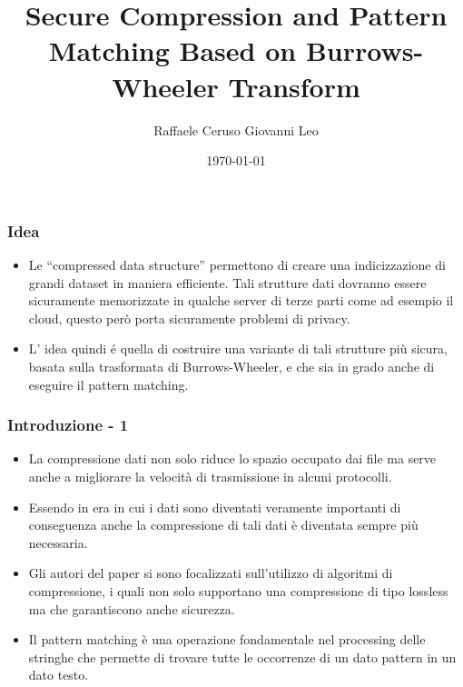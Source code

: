 \documentclass{beamer}
\title[]{Secure Compression and Pattern Matching Based on Burrows-Wheeler Transform}
\institute{Università degli Studi di Salerno}
\author{Raffaele Ceruso Giovanni Leo}
\date{\today}
\begin{document}
\begin{frame}
\titlepage
\end{frame}
\begin{frame}
\frametitle{Idea}
	\begin{itemize}
		\item Le ``compressed data structure'' permettono di creare una indicizzazione di grandi dataset in maniera efficiente. Tali strutture dati dovranno essere sicuramente memorizzate in qualche server di terze parti come ad esempio il cloud, questo però porta sicuramente problemi di privacy. \pause
		\item L’ idea quindi é quella di costruire una variante di tali strutture più sicura, basata sulla trasformata di Burrows-Wheeler, e che sia in grado anche di eseguire il pattern matching.
	\end{itemize}
\end{frame}
\begin{frame}
\frametitle{Introduzione - 1}
	\begin{itemize}
	 \item La compressione dati non solo riduce lo spazio occupato dai file ma serve anche a migliorare la velocità di trasmissione in alcuni protocolli.
	 \pause
	 \item Essendo in era in cui i dati sono diventati veramente importanti di conseguenza anche la compressione di tali dati è diventata sempre più necessaria.
	 \pause
	 \item Gli autori del paper si sono focalizzati sull’utilizzo di algoritmi di compressione, i quali non solo supportano una compressione di tipo lossless ma che garantiscono anche sicurezza.
	 \pause
	 \item Il pattern matching è una operazione fondamentale nel processing delle stringhe che permette di trovare tutte le occorrenze di un dato pattern in un dato testo.
	 \end{itemize}
\end{frame}
\end{document}
